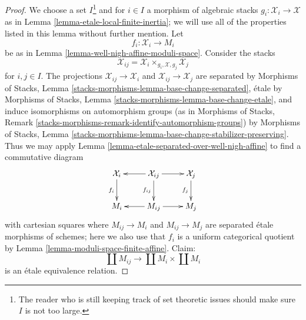 \begin{proof}
We choose a set $I$\footnote{The reader who is still keeping
track of set theoretic issues should make sure $I$ is not too large.}
and for $i \in I$ a morphism of algebraic stacks
$g_i : \mathcal{X}_i \to \mathcal{X}$ as in
Lemma \ref{lemma-etale-local-finite-inertia}; we will use all
of the properties listed in this lemma without further mention.
Let
$$
f_i : \mathcal{X}_i \to M_i
$$
be as in Lemma \ref{lemma-well-nigh-affine-moduli-space}.
Consider the stacks
$$
\mathcal{X}_{ij} = \mathcal{X}_i \times_{g_i, \mathcal{X}, g_j} \mathcal{X}_j
$$
for $i, j \in I$. The projections $\mathcal{X}_{ij} \to \mathcal{X}_i$
and $\mathcal{X}_{ij} \to \mathcal{X}_j$ are separated
by Morphisms of Stacks, Lemma
\ref{stacks-morphisms-lemma-base-change-separated},
\'etale by Morphisms of Stacks, Lemma
\ref{stacks-morphisms-lemma-base-change-etale},
and induce isomorphisms on automorphism groups
(as in Morphisms of Stacks, Remark
\ref{stacks-morphisms-remark-identify-automorphism-groups}) by
Morphisms of Stacks, Lemma
\ref{stacks-morphisms-lemma-base-change-stabilizer-preserving}.
Thus we may apply Lemma \ref{lemma-etale-separated-over-well-nigh-affine}
to find a commutative diagram
$$
\xymatrix{
\mathcal{X}_i \ar[d]_{f_i} &
\mathcal{X}_{ij} \ar[d]_{f_{ij}} \ar[l] \ar[r] &
\mathcal{X}_j \ar[d]_{f_j} \\
M_i &
M_{ij} \ar[l] \ar[r] &
M_j
}
$$
with cartesian squares where $M_{ij} \to M_i$ and $M_{ij} \to M_j$
are separated \'etale morphisms of schemes; here we also use that $f_i$
is a uniform categorical quotient by
Lemma \ref{lemma-moduli-space-finite-affine}.
Claim:
$$
\coprod M_{ij} \longrightarrow \coprod M_i \times \coprod M_i
$$
is an \'etale equivalence relation.


\end{proof}
